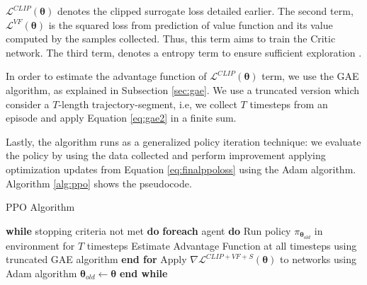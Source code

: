 $\mathcal{L}^{CLIP}(\boldsymbol{\theta})$ denotes the clipped surrogate loss detailed earlier. The second term,  $\mathcal{L}^{VF}(\boldsymbol{\theta})$ is the squared loss from prediction of value function and its value computed by the samples collected. Thus, this term aims to train the Critic network. The third term, denotes a entropy term to ensure sufficient exploration \cite{a2c}.

In order to estimate the advantage function of $\mathcal{L}^{CLIP}(\boldsymbol{\theta})$ term, we use the GAE algorithm, as explained in Subsection \ref{sec:gae}. We use a truncated version which consider a $T$-length trajectory-segment, i.e, we collect $T$ timesteps from an episode and apply Equation \eqref{eq:gae2} in a finite sum.

Lastly, the algorithm runs as a generalized policy iteration technique: we evaluate the policy by using the data collected and perform improvement applying optimization updates from Equation \eqref{eq:finalppoloss} using the Adam algorithm. Algorithm \ref{alg:ppo} shows the pseudocode.


\begin{algorithm}[H]
	\caption{PPO Algorithm}
	\begin{algorithmic}[!htbp]
		\STATE \textbf{while} stopping criteria not met \textbf{do}
		\STATE \hspace{5mm}\textbf{foreach} agent \textbf{do}
		\STATE \hspace{10mm} Run policy $\pi_{\boldsymbol{\theta}_{old}}$ in environment for $T$ timesteps
		\STATE \hspace{10mm} Estimate Advantage Function at all timesteps using truncated GAE algorithm
		\STATE \hspace{5mm} \textbf{end for}
		\STATE \hspace{5mm}Apply $  \nabla\mathcal{L}^{CLIP + VF + S}(\boldsymbol{\theta})$ to networks using Adam algorithm
		\STATE \hspace{5mm} $\boldsymbol{\theta}_{old} \leftarrow \boldsymbol{\theta}$
		\STATE \textbf{end while}
	\end{algorithmic}
	\label{alg:ppo}
\end{algorithm}
